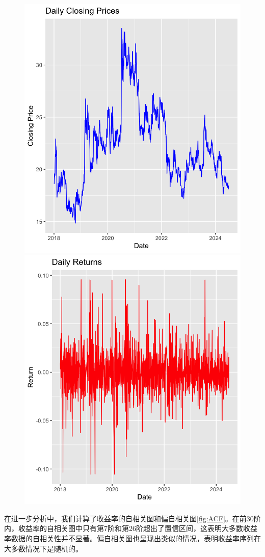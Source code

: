 \documentclass[12pt]{article}
\begin{document}
\begin{figure}[H]
\centering
{}
{\includegraphics[width=.4\textwidth]{G1.png}}
{\includegraphics[width=.4\textwidth]{G2.png}}
\caption{}\label{fig:时序图}
\end{figure}

在进一步分析中，我们计算了收益率的自相关图和偏自相关图\ref{fig:ACF}。在前30阶内，收益率的自相关图中只有第7阶和第26阶超出了置信区间，这表明大多数收益率数据的自相关性并不显著。偏自相关图也呈现出类似的情况，表明收益率序列在大多数情况下是随机的。
\end{document}
